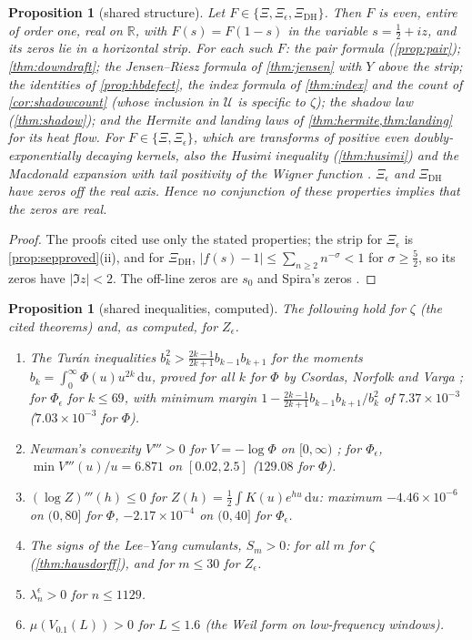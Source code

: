 \documentclass[11pt]{article}
\newtheorem{proposition}[theorem]{Proposition}
\theoremstyle{definition}\newtheorem{definition}[theorem]{Definition}
\theoremstyle{remark}\newtheorem{remark}[theorem]{Remark}
\newcommand{\R}{\mathbb R}\newcommand{\C}{\mathbb C}\newcommand{\N}{\mathbb N}
\newcommand{\dd}{\,\mathrm d}\newcommand{\e}{\mathrm e}
\begin{document}
\begin{proposition}[shared structure]\label{prop:shared}
Let $F\in\{\Xi,\Xi_\epsilon,\Xi_{\mathrm{DH}}\}$. Then $F$ is even, entire of order one, real on $\R$, with $F(s)=F(1-s)$ in the variable $s=\frac12+iz$, and its zeros lie in a horizontal strip. For each such $F$: the pair formula (\cref{prop:pair}); \cref{thm:downdraft}; the Jensen--Riesz formula of \cref{thm:jensen} with $Y$ above the strip; the identities of \cref{prop:hbdefect}, the index formula of \cref{thm:index} and the count of \cref{cor:shadowcount} (whose inclusion in $\mathcal U$ is specific to $\zeta$); the shadow law (\cref{thm:shadow}); and the Hermite and landing laws of \cref{thm:hermite,thm:landing} for its heat flow. For $F\in\{\Xi,\Xi_\epsilon\}$, which are transforms of positive even doubly-exponentially decaying kernels, also the Husimi inequality (\cref{thm:husimi}) and the Macdonald expansion with tail positivity of the Wigner function \cite{S01}. $\Xi_\epsilon$ and $\Xi_{\mathrm{DH}}$ have zeros off the real axis. Hence no conjunction of these properties implies that the zeros are real.
\end{proposition}
\begin{proof}
The proofs cited use only the stated properties; the strip for $\Xi_\epsilon$ is \cref{prop:sepproved}(ii), and for $\Xi_{\mathrm{DH}}$, $|f(s)-1|\le\sum_{n\ge2}n^{-\sigma}<1$ for $\sigma\ge\frac52$, so its zeros have $|\Im z|<2$. The off-line zeros are $s_0$ and Spira's zeros \cite{S01,Spira}.
\end{proof}

\begin{proposition}[shared inequalities, computed]\label{prop:sharedcomp}
The following hold for $\zeta$ (the cited theorems) and, as computed, for $Z_\epsilon$.
\begin{enumerate}[label=(\roman*)]
\item The Tur\'an inequalities $b_k^2>\frac{2k-1}{2k+1}b_{k-1}b_{k+1}$ for the moments $b_k=\int_0^\infty\Phi(u)u^{2k}\dd u$, proved for all $k$ for $\Phi$ by Csordas, Norfolk and Varga \cite{CNV}; for $\Phi_\epsilon$ for $k\le69$, with minimum margin $1-\frac{2k-1}{2k+1}b_{k-1}b_{k+1}/b_k^2$ of $7.37\times10^{-3}$ ($7.03\times10^{-3}$ for $\Phi$).
\item Newman's convexity $V'''>0$ for $V=-\log\Phi$ on $[0,\infty)$ \cite{Newman91}; for $\Phi_\epsilon$, $\min V'''(u)/u=6.871$ on $[0.02,2.5]$ ($129.08$ for $\Phi$).
\item $(\log Z)'''(h)\le0$ for $Z(h)=\frac12\int K(u)e^{hu}\dd u$: maximum $-4.46\times10^{-6}$ on $(0,80]$ for $\Phi$, $-2.17\times10^{-4}$ on $(0,40]$ for $\Phi_\epsilon$.
\item The signs of the Lee--Yang cumulants, $S_m>0$: for all $m$ for $\zeta$ (\cref{thm:hausdorff}), and for $m\le30$ for $Z_\epsilon$.
\item $\lambda_n^\epsilon>0$ for $n\le1129$.
\item $\mu(V_{0.1}(L))>0$ for $L\le1.6$ (the Weil form on low-frequency windows).
\end{enumerate}
\end{proposition}
\end{document}
